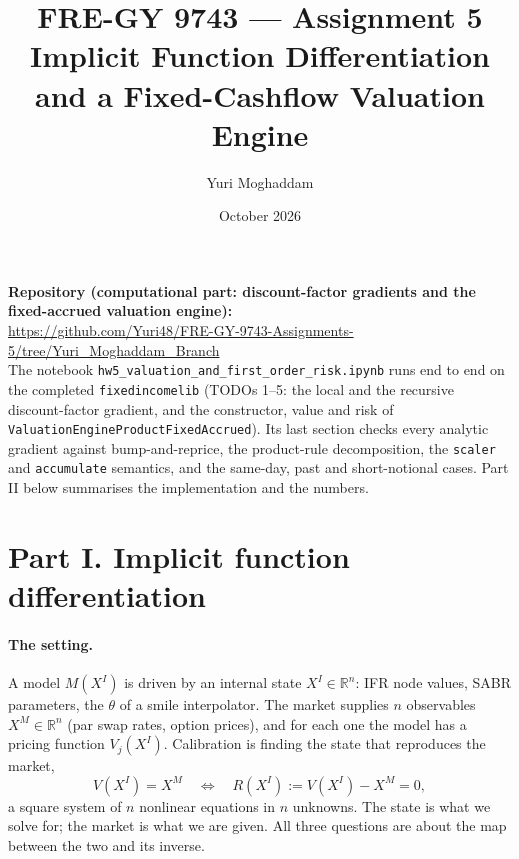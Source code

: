 \documentclass[11pt]{article}
\title{FRE-GY 9743 --- Assignment 5\\ \large Implicit Function Differentiation and a Fixed-Cashflow Valuation Engine}
\author{Yuri Moghaddam}
\date{October 2026}
\newcommand{\XI}{X^{I}}
\newcommand{\XM}{X^{M}}
\begin{document}
\maketitle

\noindent\textbf{Repository (computational part: discount-factor gradients and the fixed-accrued valuation engine):}\\
\url{https://github.com/Yuri48/FRE-GY-9743-Assignments-5/tree/Yuri_Moghaddam_Branch}\\
The notebook \texttt{hw5\_valuation\_and\_first\_order\_risk.ipynb} runs end to end on the completed \texttt{fixedincomelib} (TODOs 1--5: the local and the recursive discount-factor gradient, and the constructor, value and risk of \texttt{ValuationEngineProductFixedAccrued}). Its last section checks every analytic gradient against bump-and-reprice, the product-rule decomposition, the \texttt{scaler} and \texttt{accumulate} semantics, and the same-day, past and short-notional cases. Part II below summarises the implementation and the numbers.

\section*{Part I. Implicit function differentiation}

\paragraph{The setting.}
A model $M(\XI)$ is driven by an internal state $\XI\in\mathbb{R}^n$: IFR node values, SABR parameters, the $\theta$ of a smile interpolator. The market supplies $n$ observables $\XM\in\mathbb{R}^n$ (par swap rates, option prices), and for each one the model has a pricing function $V_j(\XI)$. Calibration is finding the state that reproduces the market,
\[
V(\XI)=\XM
\quad\Longleftrightarrow\quad
R(\XI):=V(\XI)-\XM=0,
\]
a square system of $n$ nonlinear equations in $n$ unknowns. The state is what we solve for; the market is what we are given. All three questions are about the map between the two and its inverse.
\end{document}

